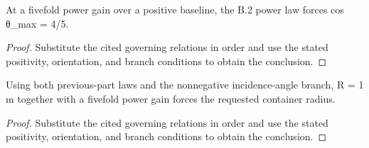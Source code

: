 \begin{lemma}
  \label{lem:physics:IPhO_2026_2_B_3:aux013}
  At a fivefold power gain over a positive baseline, the B.2 power law forces cos θ\_max = 4/5.
\end{lemma}
\begin{proof}
  Substitute the cited governing relations in order and use the stated positivity, orientation, and branch conditions to obtain the conclusion.
\end{proof}

\begin{lemma}
  \label{lem:physics:IPhO_2026_2_B_3:aux014}
  Using both previous-part laws and the nonnegative incidence-angle branch, R = 1 m together with a fivefold power gain forces the requested container radius.
\end{lemma}
\begin{proof}
  Substitute the cited governing relations in order and use the stated positivity, orientation, and branch conditions to obtain the conclusion.
\end{proof}
